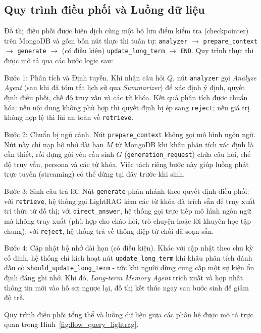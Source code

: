 \subsection{Quy trình điều phối và Luồng dữ liệu}

Đồ thị điều phối được biên dịch cùng một bộ lưu điểm kiểm tra (checkpointer) trên MongoDB và gồm bốn nút thực thi tuần tự: \texttt{analyzer} $\rightarrow$ \texttt{prepare\_context} $\rightarrow$ \texttt{generate} $\rightarrow$ (có điều kiện) \texttt{update\_long\_term} $\rightarrow$ \texttt{END}. Quy trình thực thi được mô tả qua các bước logic sau:

Bước 1: Phân tích và Định tuyến.
Khi nhận câu hỏi $Q$, nút \texttt{analyzer} gọi \textit{Analyze Agent} (sau khi đã tóm tắt lịch sử qua \textit{Summarizer}) để xác định ý định, quyết định điều phối, chế độ truy vấn và các từ khóa. Kết quả phân tích được chuẩn hóa: nếu nội dung không phù hợp thì quyết định bị ép sang \texttt{reject}; nếu giá trị không hợp lệ thì lùi an toàn về \texttt{retrieve}.

Bước 2: Chuẩn bị ngữ cảnh.
Nút \texttt{prepare\_context} không gọi mô hình ngôn ngữ. Nút này chỉ nạp bộ nhớ dài hạn $M$ từ MongoDB khi khâu phân tích xác định là cần thiết, rồi dựng gói yêu cầu sinh $G$ (\texttt{generation\_request}) chứa câu hỏi, chế độ truy vấn, persona và các từ khóa. Việc tách riêng bước này giúp luồng phát trực tuyến (streaming) có thể dừng tại đây trước khi sinh.

Bước 3: Sinh câu trả lời.
Nút \texttt{generate} phân nhánh theo quyết định điều phối: với \texttt{retrieve}, hệ thống gọi LightRAG kèm các từ khóa đã trích sẵn để truy xuất tri thức từ đồ thị; với \texttt{direct\_answer}, hệ thống gọi trực tiếp mô hình ngôn ngữ mà không truy xuất (phù hợp cho chào hỏi, trò chuyện hoặc lời khuyên học tập chung); với \texttt{reject}, hệ thống trả về thông điệp từ chối đã soạn sẵn.

Bước 4: Cập nhật bộ nhớ dài hạn (có điều kiện).
Khác với cập nhật theo chu kỳ cố định, hệ thống chỉ kích hoạt nút \texttt{update\_long\_term} khi khâu phân tích đánh dấu cờ \texttt{should\_update\_long\_term} - tức khi người dùng cung cấp một sự kiện ổn định đáng ghi nhớ. Khi đó, \textit{Long-term Memory Agent} trích xuất và hợp nhất thông tin mới vào hồ sơ; ngược lại, đồ thị kết thúc ngay sau bước sinh để giảm độ trễ.

Quy trình điều phối tổng thể và luồng dữ liệu giữa các phân hệ được mô tả trực quan trong Hình~\ref{fig:flow_query_lightrag}.

